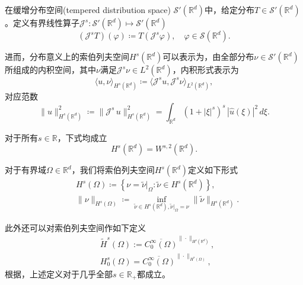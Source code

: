 \begin{definition}[分布意义上的索伯列夫空间]
  \label{definition:sobo-distribution-def}
  在缓增分布空间(tempered distribution space) $\mathcal{S}'(\mathbb{R}^d)$中，给定分布$T \in \mathcal{S}'(\mathbb{R}^d)$。定义有界线性算子$\mathcal{J}^s: \mathcal{S}'(\mathbb{R}^d) \mapsto \mathcal{S}'(\mathbb{R}^d)$
  \begin{equation*}
  \left( \mathcal{J}^s T \right)(\varphi) \coloneqq T \left( \mathcal{J}^s \varphi \right), \quad \varphi \in \mathcal{S}(\mathbb{R}^d).
  \end{equation*}

  进而，分布意义上的索伯列夫空间$H^s(\mathbb{R}^d)$可以表示为，由全部分布$\nu \in \mathcal{S}'(\mathbb{R}^d)$所组成的内积空间，其中$\nu$满足$ \mathcal{J}^s \nu \in L^2(\mathbb{R}^d)$，内积形式表示为
    \begin{equation*}
    \langle u,\nu \rangle_{H^{s}(\mathbb{R}^d)} \coloneqq \langle \mathcal{J}^s u, \mathcal{J}^s \nu \rangle_{L^2(\mathbb{R}^d)},
  \end{equation*}
  对应范数
  \begin{equation*}
    \big\| u \big\|_{H^{s}(\mathbb{R}^d)}^2 \coloneqq \big\| \mathcal{J}^s \, u \big\|_{H^{s}(\mathbb{R}^d)}^2
    = \int_{\mathbb{R}^d} \left( 1 + \left| \xi \right|^s \right)^{s} \,
    \left| \widehat{u}(\xi) \right|^2 \, d \xi.
  \end{equation*}
\end{definition}

\begin{theorem}[索伯列夫空间]
  对于所有$s \in \mathbb{R}$，下式均成立
  \begin{equation*}
    H^{s}(\mathbb{R}^d) = W^{s,2}(\mathbb{R}^d).
  \end{equation*}

  对于有界域$\Omega \in \mathbb{R}^d$，我们将索伯列夫空间$H^s(\mathbb{R}^d)$定义如下形式
  \begin{equation*}
    \begin{split}
      & H^s(\Omega) \coloneqq \left\{ \nu = \widetilde{\nu} |_{\Omega} : \widetilde{\nu} \in H^{s}(\mathbb{R}^d) \right\}, \\
       & \big\| \nu \big\|_{H^s(\Omega)} \coloneqq \inf_{\widetilde{\nu} \in H^{s}(\mathbb{R}^d),
       \widetilde{\nu} |_{\Omega} = \nu}  \big\| \widetilde{\nu} \big\|_{H^s(\mathbb{R}^d)}.
    \end{split}
  \end{equation*}

    此外还可以对索伯列夫空间作如下定义
    \begin{equation*}
      \begin{split}
        &\widetilde{H}^s(\Omega) := \overline{C_0^{\infty}(\Omega)}^{\| \cdot \|_{H^s(\mathbb{R}^d)}}, \\
        & H_0^s(\Omega) = \overline{C_0^{\infty}(\Omega)}^{\| \cdot \|_{H^s(\Omega)}},
      \end{split}
    \end{equation*}
    根据\cite[Theorem 3.33]{McLean:2000ta}，上述定义对于几乎全部$s \in \mathbb{R}_{+}$都成立。
\end{theorem}

